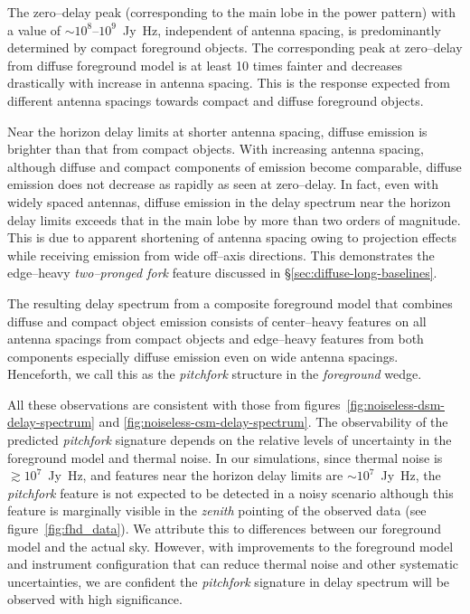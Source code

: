 \documentclass[preprint2,iop,numberedappendix]{emulateapj}
\begin{document}
The zero--delay peak (corresponding to the main lobe in the power pattern) with a value of $\sim 10^8$--$10^9$~Jy~Hz, independent of antenna spacing, is predominantly determined by compact foreground objects. The corresponding peak at zero--delay from diffuse foreground model is at least 10 times fainter and decreases drastically with increase in antenna spacing. This is the response expected from different antenna spacings towards compact and diffuse foreground objects. 

Near the horizon delay limits at shorter antenna spacing, diffuse emission is brighter than that from compact objects. With increasing antenna spacing, although diffuse and compact components of emission become comparable, diffuse emission does not decrease as rapidly as seen at zero--delay. In fact, even with widely spaced antennas, diffuse emission in the delay spectrum near the horizon delay limits exceeds that in the main lobe by more than two orders of magnitude. This is due to apparent shortening of antenna spacing owing to projection effects while receiving emission from wide off--axis directions. This demonstrates the edge--heavy {\it two--pronged fork} feature discussed in \S\ref{sec:diffuse-long-baselines}.

The resulting delay spectrum from a composite foreground model that combines diffuse and compact object emission consists of center--heavy features on all antenna spacings from compact objects and edge--heavy features from both components especially diffuse emission even on wide antenna spacings. Henceforth, we call this as the {\it pitchfork} structure in the {\it foreground} wedge.

All these observations are consistent with those from figures~\ref{fig:noiseless-dsm-delay-spectrum} and \ref{fig:noiseless-csm-delay-spectrum}. The observability of the predicted {\it pitchfork} signature depends on the relative levels of uncertainty in the foreground model and thermal noise. In our simulations, since thermal noise is $\gtrsim 10^7$~Jy~Hz, and features near the horizon delay limits are $\sim 10^7$~Jy~Hz, the {\it pitchfork} feature is not expected to be detected in a noisy scenario although this feature is marginally visible in the {\it zenith} pointing of the observed data (see figure~\ref{fig:fhd_data}). We attribute this to differences between our foreground model and the actual sky. However, with improvements to the foreground model and instrument configuration that can reduce thermal noise and other systematic uncertainties, we are confident the {\it pitchfork} signature in delay spectrum will be observed with high significance.
\end{document}
